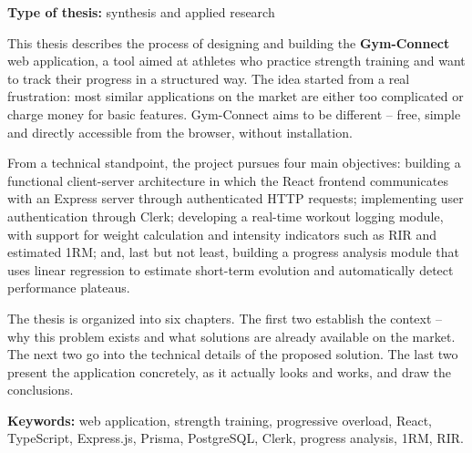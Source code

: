 \textbf{Type of thesis:} synthesis and applied research

\vspace{1em}

This thesis describes the process of designing and building the
\textbf{Gym-Connect} web application, a tool aimed at athletes who
practice strength training and want to track their progress in a
structured way. The idea started from a real frustration: most
similar applications on the market are either too complicated or
charge money for basic features. Gym-Connect aims to be different --
free, simple and directly accessible from the browser, without
installation.

From a technical standpoint, the project pursues four main objectives:
building a functional client-server architecture in which the React
frontend communicates with an Express server through authenticated
HTTP requests; implementing user authentication through Clerk;
developing a real-time workout logging module, with support for
weight calculation and intensity indicators such as RIR and
estimated 1RM; and, last but not least, building a progress analysis
module that uses linear regression to estimate short-term evolution
and automatically detect performance plateaus.

The thesis is organized into six chapters. The first two establish
the context -- why this problem exists and what solutions are already
available on the market. The next two go into the technical details
of the proposed solution. The last two present the application
concretely, as it actually looks and works, and draw the conclusions.

\vspace{1em}
\noindent\textbf{Keywords:} web application, strength training,
progressive overload, React, TypeScript, Express.js, Prisma,
PostgreSQL, Clerk, progress analysis, 1RM, RIR.
